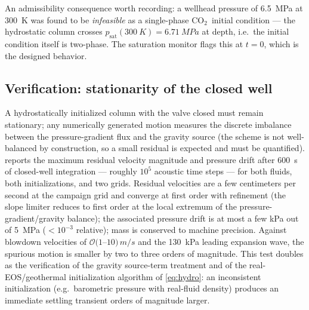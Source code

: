 \documentclass[11pt]{article}
\newcommand{\co}{CO$_2$}
\begin{document}
An admissibility consequence worth recording: a wellhead pressure of
\SI{6.5}{MPa} at \SI{300}{K} was found to be \emph{infeasible} as a
single-phase \co\ initial condition --- the hydrostatic column crosses
$p_{\mathrm{sat}}(\SI{300}{K}) = \SI{6.71}{MPa}$ at depth, i.e.\ the
initial condition itself is two-phase. The saturation monitor flags
this at $t=0$, which is the designed behavior.

\subsection{Verification: stationarity of the closed well}
\label{sec:stationarity}

A hydrostatically initialized column with the valve closed must remain
stationary; any numerically generated motion measures the discrete
imbalance between the pressure-gradient flux and the gravity source
(the scheme is not well-balanced by construction, so a small residual
is expected and must be quantified).  reports the
maximum residual velocity magnitude and pressure drift after
\SI{600}{s} of closed-well integration --- roughly $10^5$ acoustic
time steps --- for both fluids, both initializations, and two grids.
Residual velocities are a few centimeters per second at the campaign
grid and converge at first order with refinement (the slope limiter
reduces to first order at the local extremum of the
pressure-gradient/gravity balance); the associated pressure drift is
at most a few kPa out of \SI{5}{MPa} ($<10^{-3}$ relative); mass is
conserved to machine precision. Against blowdown velocities of
$\mathcal{O}(1$--$10)\,\si{m/s}$ and the \SI{130}{kPa} leading
expansion wave, the spurious motion is smaller by two to three orders
of magnitude. This test doubles as the
verification of the gravity source-term treatment and of the
real-EOS/geothermal initialization algorithm of \cref{eq:hydro}: an
inconsistent initialization (e.g.\ barometric pressure with real-fluid
density) produces an immediate settling transient orders of magnitude
larger.
\end{document}
